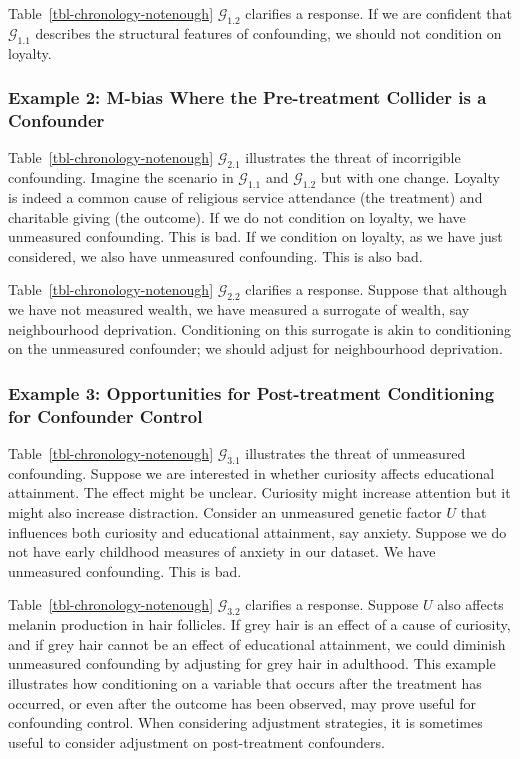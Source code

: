 \documentclass[
  single column]{article}
\begin{document}
Table~\ref{tbl-chronology-notenough} \(\mathcal{G}_{1.2}\) clarifies a
response. If we are confident that \(\mathcal{G}_{1.1}\) describes the
structural features of confounding, we should not condition on loyalty.

\subsubsection{Example 2: M-bias Where the Pre-treatment Collider is a
Confounder}\label{example-2-m-bias-where-the-pre-treatment-collider-is-a-confounder}

Table~\ref{tbl-chronology-notenough} \(\mathcal{G}_{2.1}\) illustrates
the threat of incorrigible confounding. Imagine the scenario in
\(\mathcal{G}_{1.1}\) and \(\mathcal{G}_{1.2}\) but with one change.
Loyalty is indeed a common cause of religious service attendance (the
treatment) and charitable giving (the outcome). If we do not condition
on loyalty, we have unmeasured confounding. This is bad. If we condition
on loyalty, as we have just considered, we also have unmeasured
confounding. This is also bad.

Table~\ref{tbl-chronology-notenough} \(\mathcal{G}_{2.2}\) clarifies a
response. Suppose that although we have not measured wealth, we have
measured a surrogate of wealth, say neighbourhood deprivation.
Conditioning on this surrogate is akin to conditioning on the unmeasured
confounder; we should adjust for neighbourhood deprivation.

\subsubsection{Example 3: Opportunities for Post-treatment Conditioning
for Confounder
Control}\label{example-3-opportunities-for-post-treatment-conditioning-for-confounder-control}

Table~\ref{tbl-chronology-notenough} \(\mathcal{G}_{3.1}\) illustrates
the threat of unmeasured confounding. Suppose we are interested in
whether curiosity affects educational attainment. The effect might be
unclear. Curiosity might increase attention but it might also increase
distraction. Consider an unmeasured genetic factor \(U\) that influences
both curiosity and educational attainment, say anxiety. Suppose we do
not have early childhood measures of anxiety in our dataset. We have
unmeasured confounding. This is bad.

Table~\ref{tbl-chronology-notenough} \(\mathcal{G}_{3.2}\) clarifies a
response. Suppose \(U\) also affects melanin production in hair
follicles. If grey hair is an effect of a cause of curiosity, and if
grey hair cannot be an effect of educational attainment, we could
diminish unmeasured confounding by adjusting for grey hair in adulthood.
This example illustrates how conditioning on a variable that occurs
after the treatment has occurred, or even after the outcome has been
observed, may prove useful for confounding control. When considering
adjustment strategies, it is sometimes useful to consider adjustment on
post-treatment confounders.
\end{document}
